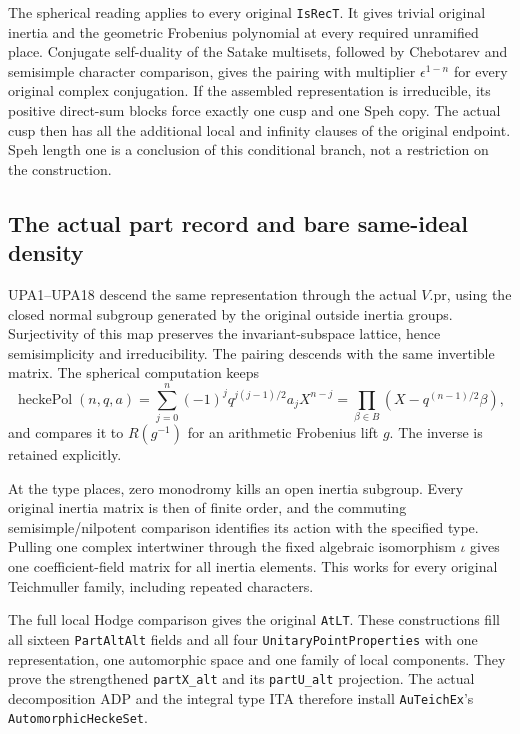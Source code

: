 The spherical reading applies to every original \texttt{IsRecT}.
It gives trivial original inertia and the geometric Frobenius
polynomial at every required unramified place.  Conjugate
self-duality of the Satake multisets, followed by Chebotarev and
semisimple character comparison, gives the pairing with multiplier
$\epsilon^{1-n}$ for every original complex conjugation.
If the assembled representation is irreducible, its positive
direct-sum blocks force exactly one cusp and one Speh copy.  The
actual cusp then has all the additional local and infinity clauses
of the original endpoint.  Speh length one is a conclusion of this
conditional branch, not a restriction on the construction.

\subsection{The actual part record and bare same-ideal density}

UPA1--UPA18 descend the same representation through the actual
$V.\mathrm{pr}$, using the closed normal subgroup generated by
the original outside inertia groups.  Surjectivity of this map
preserves the invariant-subspace lattice, hence semisimplicity and
irreducibility.  The pairing descends with the same invertible
matrix.  The spherical computation keeps
\[
 \operatorname{heckePol}(n,q,a)
   =\sum_{j=0}^n(-1)^jq^{j(j-1)/2}a_jX^{n-j}
   =\prod_{\beta\in B}(X-q^{(n-1)/2}\beta),
\]
and compares it to $R(g^{-1})$ for an arithmetic Frobenius lift
$g$.  The inverse is retained explicitly.

At the type places, zero monodromy kills an open inertia subgroup.
Every original inertia matrix is then of finite order, and the
commuting semisimple/nilpotent comparison identifies its action
with the specified type.  Pulling one complex intertwiner through
the fixed algebraic isomorphism $\iota$ gives one coefficient-field
matrix for all inertia elements.  This works for every original
Teichmuller family, including repeated characters.

The full local Hodge comparison gives the original
\texttt{AtLT}.  These constructions fill all sixteen
\texttt{PartAltAlt} fields and all four
\texttt{UnitaryPointProperties} with one representation, one
automorphic space and one family of local components.
They prove the strengthened \texttt{partX\_alt} and its
\texttt{partU\_alt} projection.  The actual decomposition ADP
and the integral type ITA therefore install
\texttt{AuTeichEx}'s \texttt{AutomorphicHeckeSet}.

